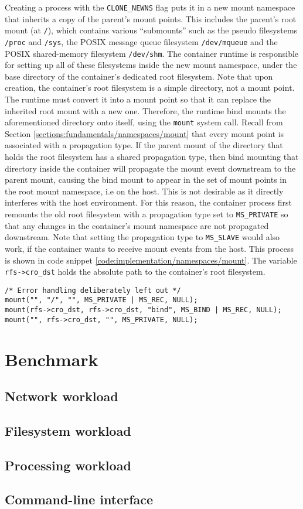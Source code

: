 Creating a process with the \verb|CLONE_NEWNS| flag puts it in a new mount namespace that 
inherits a copy of the parent's mount points. This includes the parent's root mount (at \verb|/|),
which contains various \enquote{submounts} such as the pseudo filesystems \verb|/proc| and \verb|/sys|,
the POSIX message queue filesystem \verb|/dev/mqueue| and the POSIX shared-memory filesystem \verb|/dev/shm|.
The container runtime is responsible for setting up all of these filesystems inside the new mount namespace,
under the base directory of the container's dedicated root filesystem. Note that upon creation,
the container's root filesystem is a simple directory, not a mount point. 
The runtime must convert it into a mount point so that it can replace the inherited root mount 
with a new one. Therefore, the runtime bind mounts the aforementioned directory onto itself, using 
the \verb|mount| system call. Recall from Section \ref{sections:fundamentals/namespaces/mount} 
that every mount point is associated with a propagation type. If the parent mount of the 
directory that holds the root filesystem has a shared propagation type, then bind mounting 
that directory inside the container will propagate the mount event downstream to the parent mount, 
causing the bind mount to appear in the set of mount points in the root mount namespace, i.e on the host.
This is not desirable as it directly interferes with the host environment. For this reason, 
the container process first remounts the old root filesystem with a propagation type set to \verb|MS_PRIVATE|
so that any changes in the container's mount namespace are not propagated downstream. 
Note that setting the propagation type to \verb|MS_SLAVE| would also work, if the container 
wants to receive mount events from the host. This process is shown in code snippet \ref{code:implementation/namespaces/mount}.
The variable \verb|rfs->cro_dst| holds the absolute path to the container's root filesystem.

\begin{lstlisting}[style=c-code-snippets, label={code:implementation/namespaces/mount}, caption={Remounting the original root filesystem to disable mount propagation events and bind mounting the container's root filesystem onto itself.}]
/* Error handling deliberately left out */
mount("", "/", "", MS_PRIVATE | MS_REC, NULL);
mount(rfs->cro_dst, rfs->cro_dst, "bind", MS_BIND | MS_REC, NULL);
mount("", rfs->cro_dst, "", MS_PRIVATE, NULL);
\end{lstlisting}

\section{Benchmark}
\label{ch:implementation/benchmark}
\subsection{Network workload}
\subsection{Filesystem workload}
\subsection{Processing workload}
\subsection{Command-line interface}
